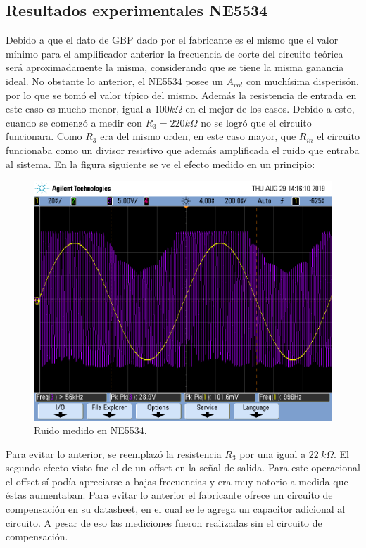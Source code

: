 \subsection{Resultados experimentales NE5534}

Debido a que el dato de GBP dado por el fabricante es el mismo que el valor mínimo para el amplificador anterior la frecuencia de corte del circuito teórica será aproximadamente la misma, considerando que se tiene la misma ganancia ideal. No obstante lo anterior, el NE5534 posee un $A_{vol}$ con muchísima disperisón, por lo que se tomó el valor típico del mismo. Además la resistencia de entrada en este caso es mucho menor, igual a $100k\Omega$ en el mejor de los casos. Debido a esto, cuando se comenzó a medir con $R_3 = 220k\Omega$ no se logró que el circuito funcionara. Como $R_3$ era del mismo orden, en este caso mayor, que $R_{in}$ el circuito funcionaba como un divisor resistivo que además amplificada el ruido que entraba al sistema. En la figura siguiente se ve el efecto medido en un principio:


\begin{figure}[H]	
	\centering
	\includegraphics[width=\textwidth, trim = {0 3.3cm 0 2cm},clip]{Ejercicio2/Imagenes/ruido.png}
	\caption{Ruido medido en NE5534.}
	\label{fig:ruido}
\end{figure}

Para evitar lo anterior, se reemplazó la resistencia $R_3$ por una igual a $22 \ k\Omega$. El segundo efecto visto fue el de un offset en la señal de salida. Para este operacional el offset sí podía apreciarse a bajas frecuencias y era muy notorio a medida que éstas aumentaban. Para evitar lo anterior el fabricante ofrece un circuito de compensación en su datasheet, en el cual se le agrega un capacitor adicional al circuito. A pesar de eso las mediciones fueron realizadas sin el circuito de compensación.

